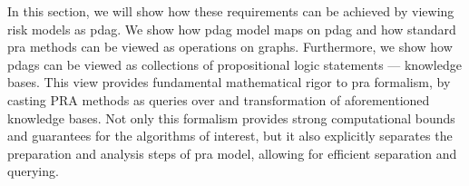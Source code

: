 In this section, we will show how these requirements can be achieved by viewing risk models as \acrfull{pdag}. We show how \acrshort{pdag} model maps on \acrshort{pdag} and how standard \acrshort{pra} methods can be viewed as operations on graphs. 
Furthermore, we show how \acrshort{pdag}s can be viewed as collections of propositional logic statements --- knowledge bases.
This view provides fundamental mathematical rigor to \acrshort{pra} formalism, by casting PRA methods as queries over and transformation of aforementioned knowledge bases.
Not only this formalism provides strong computational bounds and guarantees for the algorithms of interest, but it also explicitly separates the preparation and analysis steps of \acrshort{pra} model, allowing for efficient separation and querying.

